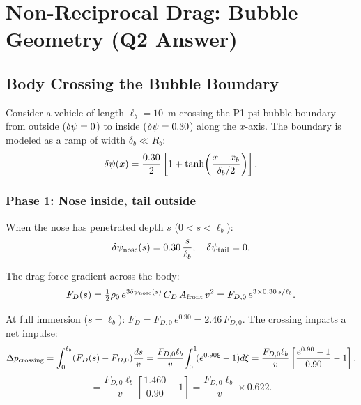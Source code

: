 \section{Non-Reciprocal Drag: Bubble Geometry (Q2 Answer)}
\label{sec:drag_bubble}

\subsection{Body Crossing the Bubble Boundary}

Consider a vehicle of length $\ell_b = 10$~m crossing the P1 psi-bubble
boundary from outside ($\delta\psi = 0$) to inside ($\delta\psi = 0.30$) along
the $x$-axis. The boundary is modeled as a ramp of width $\delta_b \ll R_b$:
\begin{equation}
\delta\psi(x) = \frac{0.30}{2}\left[1 + \tanh\!\left(\frac{x - x_b}{\delta_b/2}\right)\right].
\label{eq:ramp_profile}
\end{equation}

\subsubsection*{Phase 1: Nose inside, tail outside}

When the nose has penetrated depth $s$ ($0 < s < \ell_b$):
\begin{equation}
\delta\psi_{\rm nose}(s) = 0.30\,\frac{s}{\ell_b}, \quad \delta\psi_{\rm tail} = 0.
\label{eq:partial_immersion}
\end{equation}

The drag force gradient across the body:
\begin{equation}
F_D(s) = \tfrac{1}{2}\rho_0\,e^{3\delta\psi_{\rm nose}(s)}\,C_D\,A_{\rm front}\,v^2
= F_{D,0}\,e^{3\times0.30\,s/\ell_b}.
\label{eq:drag_crossing}
\end{equation}

At full immersion ($s = \ell_b$): $F_D = F_{D,0}\,e^{0.90} = 2.46\,F_{D,0}$.
The crossing imparts a net impulse:
\begin{equation}
\Delta p_{\rm crossing} = \int_0^{\ell_b} (F_D(s) - F_{D,0})\frac{ds}{v}
= \frac{F_{D,0}\ell_b}{v}\!\int_0^1\!(e^{0.90\xi}-1)d\xi
= \frac{F_{D,0}\ell_b}{v}\left[\frac{e^{0.90}-1}{0.90}-1\right].
\label{eq:impulse}
\end{equation}
\begin{equation}
= \frac{F_{D,0}\ell_b}{v}\left[\frac{1.460}{0.90}-1\right]
= \frac{F_{D,0}\ell_b}{v}\times0.622.
\label{eq:impulse_numerical}
\end{equation}

